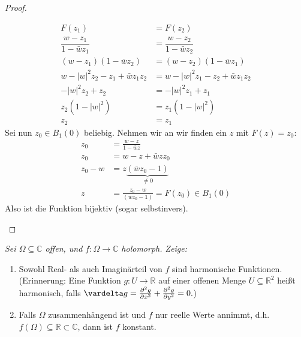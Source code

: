 \documentclass[11pt]{article}
\newcommand{\R}{\mathbb{R}}
\newcommand{\C}{\mathbb{C}}
\newenvironment{problem}[2][Beispiel]{
    \begin{trivlist}
        \item[\hskip \labelsep {\bfseries #1}\hskip \labelsep {\bfseries #2.}] \itshape}{
    \end{trivlist}\normalshape
}
\begin{document}
\begin{proof}
\begin{enumerate}[label=(\alph*)]
            $$\begin{aligned}
                  F(z_1) &= F(z_2)\\
                  \dfrac{w-z_1}{1-\bar{w}z_1} &= \dfrac{w-z_2}{1-\bar{w}z_2}\\
                  (w-z_1)(1-\bar{w}z_2) &= (w-z_2)(1-\bar{w}z_1)\\
                  w-|w|^{2}z_2-z_1+\bar{w}z_1z_2 &= w-|w|^{2}z_1-z_2+\bar{w}z_1z_2\\
                  -|w|^{2}z_2+z_2 &= -|w|^{2}z_1+z_1\\
                  z_2 (1-|w|^2) &= z_1 (1-|w|^2)\\
                  z_2&= z_1
            \end{aligned}$$
            Sei nun $z_0\in B_1(0)$ beliebig. Nehmen wir an wir finden ein $z$ mit
            $F(z) = z_0$:
            $$\begin{aligned}
                  z_0 &= \frac{w-z}{1-\bar{w}z}\\
                  z_0 &= w-z+\bar{w}zz_0\\
                  z_0 -w &= z \underbrace{(\bar{w}z_0 -1)}_{\neq 0}\\
                  z &= \frac{z_0 -w}{(\bar{w}z_0 -1)} = F(z_0)\in B_1(0)
            \end{aligned}$$
            Also ist die Funktion bijektiv (sogar selbstinvers).
            
        \end{enumerate}
    \end{proof}

    \begin{problem}{4}
        Sei $\Omega\subseteq \C$ offen, und $f:\Omega \to \C$ holomorph. Zeige:
        \begin{enumerate}[label=(\alph*)]
            \item Sowohl Real- als auch Imaginärteil von $f$ sind harmonische
            Funktionen. \\(Erinnerung: Eine Funktion $g:U\to \R$ auf einer offenen
            Menge $U\subseteq \R^2$ heißt harmonisch, falls $\vardelta g=
            \frac{\partial^2 g}{\partial x^2}+\frac{\partial^2 g}{\partial y^2}=0.$)
            \item Falls $\Omega$ zusammenhängend ist und $f$ nur reelle Werte annimmt,
            d.h. $f(\Omega)\subseteq \R\subset \C$, dann ist $f$ konstant.
        \end{enumerate}
    \end{problem}
\end{document}
